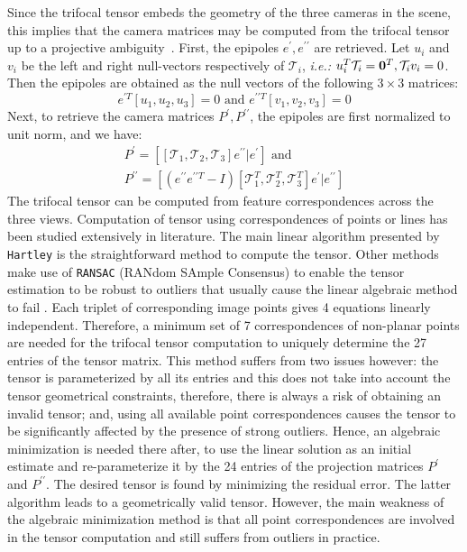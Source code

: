 Since the trifocal tensor embeds the geometry of the three cameras in the scene, this implies that the camera matrices may be computed from the trifocal tensor up to a projective ambiguity~\cite{Hartley2004}. First, the epipoles $e^{\prime},e^{\prime \prime}$ are retrieved. Let $u_i$ and $v_i$ be the left and right null-vectors respectively of $\mathcal{T}_{i}$, \textit{i.e.:} $u_{i}^{T} \mathcal{T}_{i} = {\bf 0}^{T}, \mathcal{T}_{i}v_i = 0$. Then the epipoles are obtained as the null vectors of the following $ 3 \times 3$ matrices:
\begin{equation}
  e^{\prime T} [u_1, u_2, u_3] = 0  \text{ and } e^{\prime \prime T}[v_1, v_2, v_3] = 0
  \label{eq:recoveringepipoles}
\end{equation}
Next, to retrieve the camera matrices $P^{\prime}, P^{\prime \prime}$, the epipoles are first normalized to unit norm, and we have:
\begin{equation}
\begin{gathered}
  P^{\prime} = [[\mathcal{T}_{1}, \mathcal{T}_{2},\mathcal{T}_{3}] e^{\prime \prime} | e^{\prime}] \text{ and }\\ P^{\prime \prime} = [(e^{\prime \prime} e^{\prime \prime T} - I)[\mathcal{T}_{1}^{T}, \mathcal{T}_{2}^{T},\mathcal{T}_{3}^{T}] e^{\prime} | e^{\prime \prime}]
  \end{gathered}\label{eq:recoveringprojectionmatrices}
\end{equation}
The trifocal tensor can be computed from feature correspondences across the three views. Computation of tensor using correspondences of points or lines has been studied extensively in literature. The main linear algorithm presented by \texttt{Hartley}\cite{Hartley2004} is the straightforward method to compute the tensor. Other methods make use of \texttt{RANSAC} (RANdom SAmple Consensus) to enable the tensor estimation to be robust to outliers that usually cause the linear algebraic method to fail \cite{torr1997robust}.
Each triplet of corresponding image points gives 4 equations linearly independent. Therefore, a minimum set of 7 correspondences of non-planar points are needed for the trifocal tensor computation to uniquely determine the 27 entries of the tensor matrix. This method suffers from two issues however: the tensor is parameterized by all its entries and this does not take into account the tensor geometrical constraints, therefore, there is always a risk of obtaining an invalid tensor; and, using all available point correspondences causes the tensor to be significantly affected by the presence of strong outliers.
Hence, an algebraic minimization is needed there after, to use the linear solution as an initial estimate and re-parameterize it by the 24 entries of the projection matrices $P^\prime$ and $P^{\prime \prime}$. The desired tensor is found by minimizing the residual error. The latter algorithm leads to a geometrically valid tensor. However, the main weakness of the algebraic minimization method is that all point correspondences are involved in the tensor computation and still suffers from outliers in practice.
